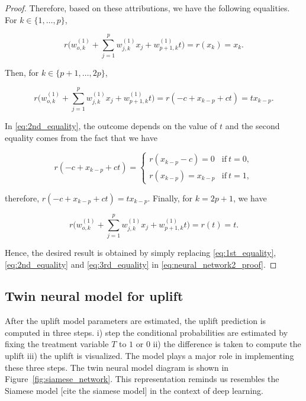 \documentclass{article}
\def \vahid {\color{magenta}}
\begin{document}
\begin{proof}
Therefore, based on these attributions, we have the following equalities. For $k \in \{1, \ldots, p\}$, 

\begin{equation}
    r\Big(w_{o,k}^{(1)} + \sum_{j=1}^{p} w_{j,k}^{(1)} x_j +  w_{p+1,k}^{(1)} t \Big) = r(x_k) = x_k.
    \label{eq:1st_equality}
\end{equation}

Then, for $k \in \{p+1, \ldots, 2p\}$,

\begin{equation}
    r\Big(w_{o,k}^{(1)} + \sum_{j=1}^{p} w_{j,k}^{(1)} x_j +  w_{p+1,k}^{(1)} t \Big) = r(-c + x_{k-p} + ct) = t x_{k-p}.
    \label{eq:2nd_equality}
\end{equation}

In \eqref{eq:2nd_equality}, the outcome depends on the value of $t$ and the second equality comes from the fact that we have

\[ r(-c + x_{k-p} + ct) = 
    \left\{ \begin{array}{ll}
      r(x_{k-p} - c) = 0 & \mathrm{if}~t = 0,\\
      r(x_{k-p}) = x_{k-p} & \mathrm{if}~t=1,
            \end{array} \right.
\]

therefore, $r(-c + x_{k-p} + ct) = t x_{k-p}$. Finally, for $k=2p+1$, we have

\begin{equation}
    r\Big(w_{o,k}^{(1)} + \sum_{j=1}^{p} w_{j,k}^{(1)} x_j +  w_{p+1,k}^{(1)} t \Big) = r(t) = t.
    \label{eq:3rd_equality}
\end{equation}

Hence, the desired result is obtained by simply replacing \eqref{eq:1st_equality}, \eqref{eq:2nd_equality} and \eqref{eq:3rd_equality} in \eqref{eq:neural_network2_proof}.
\end{proof}



\subsection{Twin neural model for uplift}

After the uplift model parameters are estimated, the uplift prediction is computed in three steps. i) step the conditional probabilities are estimated by fixing the treatment variable $T$ to $1$ or $0$ ii)  the difference is taken to compute the uplift iii) the uplift is visualized. The model plays a major role in implementing these three steps. The twin neural model diagram is shown in  Figure~\ref{fig:siamese_network}. This representation reminds us resembles the Siamese model {\vahid [cite the siamese model]} \cite{} in the context of deep learning.
\end{document}
